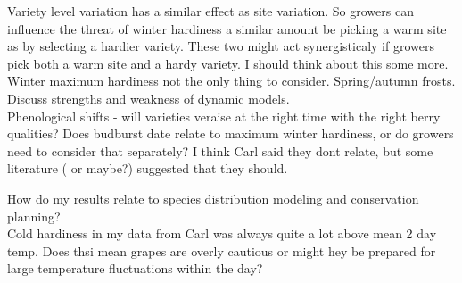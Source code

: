 \documentclass[11pt,letter]{article}
\begin{document}
Variety level variation has a similar effect as site variation. So growers can influence the threat of winter hardiness a similar amount be picking a warm site as by selecting a hardier variety. These two might act synergisticaly if growers pick both a warm site and a hardy variety. I should think about this some more. \\

Winter maximum hardiness not the only thing to consider. Spring/autumn frosts. Discuss strengths and weakness of dynamic models. \\

Phenological shifts - will varieties veraise at the right time with the right berry qualities? Does budburst date relate to maximum winter hardiness, or do growers need to consider that separately? I think Carl said they dont relate, but some literature (\cite{Ferguson2014} or \cite{Kovaleski2018a} maybe?) suggested that they should. 

How do my results relate to species distribution modeling and conservation planning? \\

Cold hardiness in my data from Carl was always quite a lot above mean 2 day temp. Does thsi mean grapes are overly cautious or might hey be prepared for large temperature fluctuations within the day? \\







\end{document}
